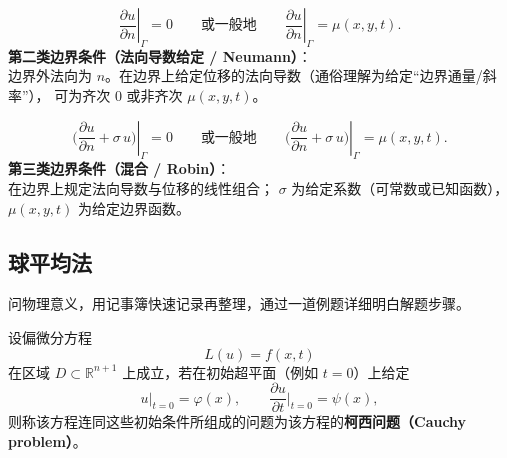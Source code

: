 \begin{solution}
\begin{dxsolution}
\[
\left.\dfrac{\partial u}{\partial n}\right|_{\Gamma}=0
\qquad\text{或一般地}\qquad
\left.\dfrac{\partial u}{\partial n}\right|_{\Gamma}=\mu(x,y,t).
\]
\tcblower
\textbf{第二类边界条件（法向导数给定 / Neumann）}：\\
边界外法向为 $n$。在边界上给定位移的法向导数（通俗理解为给定“边界通量/斜率”），
可为齐次 $0$ 或非齐次 $\mu(x,y,t)$。

\end{dxsolution}

\begin{dxsolution}
\[
\left.\Big(\dfrac{\partial u}{\partial n}+\sigma\,u\Big)\right|_{\Gamma}=0
\qquad\text{或一般地}\qquad
\left.\Big(\dfrac{\partial u}{\partial n}+\sigma\,u\Big)\right|_{\Gamma}=\mu(x,y,t).
\]
\tcblower
\textbf{第三类边界条件（混合 / Robin）}：\\
在边界上规定法向导数与位移的线性组合；
$\sigma$ 为给定系数（可常数或已知函数），
$\mu(x,y,t)$ 为给定边界函数。

\end{dxsolution}
\subsection{球平均法}
\begin{dxtips}[学习方法]
 问物理意义，用记事簿快速记录再整理，通过一道例题详细明白解题步骤。   
\end{dxtips}
\begin{definition}[柯西问题给t=0的初始时刻条件]
设偏微分方程
\[
L(u)=f(x,t)
\]
在区域 $D \subset \mathbb{R}^{n+1}$ 上成立，若在初始超平面（例如 $t=0$）上给定
\[
u|_{t=0}=\varphi(x), \qquad 
\frac{\partial u}{\partial t}\Big|_{t=0}=\psi(x),
\]
则称该方程连同这些初始条件所组成的问题为该方程的\textbf{柯西问题（Cauchy problem）}。


\end{definition}
\end{solution}
